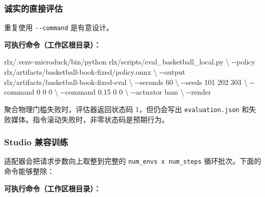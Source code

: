 \documentclass[
  chinese,
  11pt,
  letterpaper,
]{article}
\newenvironment{Shaded}{\begin{snugshade}}{\end{snugshade}}
\newcommand{\AttributeTok}[1]{\textcolor[rgb]{0.13,0.29,0.53}{#1}}
\newcommand{\DataTypeTok}[1]{\textcolor[rgb]{0.13,0.29,0.53}{#1}}
\newcommand{\ExtensionTok}[1]{#1}
\newcommand{\NormalTok}[1]{#1}
\renewenvironment{Shaded}{\par\smallskip}{\par\smallskip}
\begin{document}
\subsubsection{诚实的直接评估}\label{ux8bdaux5b9eux7684ux76f4ux63a5ux8bc4ux4f30}

重复使用 \texttt{-\/-command} 是有意设计。

\textbf{可执行命令（工作区根目录）：}

\begin{Shaded}
\begin{Highlighting}[]
\ExtensionTok{rlx/.venv{-}microduck/bin/python}\NormalTok{ rlx/scripts/eval\_basketball\_local.py }\DataTypeTok{\textbackslash{}}
  \AttributeTok{{-}{-}policy}\NormalTok{ rlx/artifacts/basketball{-}book{-}fixed/policy.onnx }\DataTypeTok{\textbackslash{}}
  \AttributeTok{{-}{-}output}\NormalTok{ rlx/artifacts/basketball{-}book{-}fixed{-}eval }\DataTypeTok{\textbackslash{}}
  \AttributeTok{{-}{-}seconds}\NormalTok{ 60 }\DataTypeTok{\textbackslash{}}
  \AttributeTok{{-}{-}seeds}\NormalTok{ 101 202 303 }\DataTypeTok{\textbackslash{}}
  \AttributeTok{{-}{-}command}\NormalTok{ 0 0 0 }\DataTypeTok{\textbackslash{}}
  \AttributeTok{{-}{-}command}\NormalTok{ 0.15 0 0 }\DataTypeTok{\textbackslash{}}
  \AttributeTok{{-}{-}actuator}\NormalTok{ bam }\DataTypeTok{\textbackslash{}}
  \AttributeTok{{-}{-}render}
\end{Highlighting}
\end{Shaded}

聚合物理门槛失败时，评估器返回状态码 1，但仍会写出
\texttt{evaluati\allowbreak{}on.json}
和失败媒体。指令滚动失败时，非零状态码是预期行为。

\subsubsection{Studio 兼容训练}\label{studio-ux517cux5bb9ux8badux7ec3}

适配器会把请求步数向上取整到完整的 \texttt{num\_envs\ x\ num\_steps}
循环批次。下面的命令能够整除：

\textbf{可执行命令（工作区根目录）：}
\end{document}

